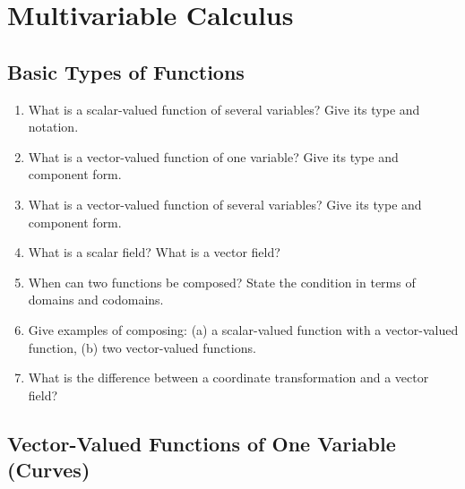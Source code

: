 \section*{Multivariable Calculus}

\subsection*{Basic Types of Functions}

\begin{enumerate}

\item What is a scalar-valued function of several variables? Give its type and notation.

\item What is a vector-valued function of one variable? Give its type and component form.

\item What is a vector-valued function of several variables? Give its type and component form.

\item What is a scalar field? What is a vector field?

\item When can two functions be composed? State the condition in terms of domains and codomains.

\item Give examples of composing:
(a) a scalar-valued function with a vector-valued function,
(b) two vector-valued functions.

\item What is the difference between a coordinate transformation and a vector field?

\end{enumerate}

\subsection*{Vector-Valued Functions of One Variable (Curves)}

